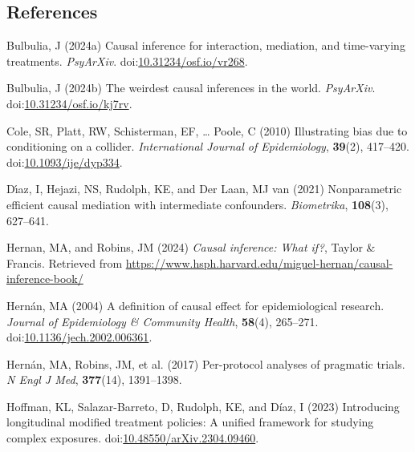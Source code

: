 \documentclass[
  single column]{article}
\newlength{\cslhangindent}
\newenvironment{CSLReferences}[2] %
 {\begin{list}{}{%
  \setlength{\itemindent}{0pt}
  \setlength{\leftmargin}{0pt}
  \setlength{\parsep}{0pt}
  \ifodd #1
   \setlength{\leftmargin}{\cslhangindent}
   \setlength{\itemindent}{-1\cslhangindent}
  \fi
  \setlength{\itemsep}{#2\baselineskip}}}
 {\end{list}}
\begin{document}
\newpage{}

\subsection{References}\label{references}

\label{refs}
\begin{CSLReferences}{1}{0}
Bulbulia, J (2024a) Causal inference for interaction, mediation, and
time-varying treatments. \emph{PsyArXiv}.
doi:\href{https://doi.org/10.31234/osf.io/vr268}{10.31234/osf.io/vr268}.

Bulbulia, J (2024b) The weirdest causal inferences in the world.
\emph{PsyArXiv}.
doi:\href{https://doi.org/10.31234/osf.io/kj7rv}{10.31234/osf.io/kj7rv}.

Cole, SR, Platt, RW, Schisterman, EF, \ldots{} Poole, C (2010)
Illustrating bias due to conditioning on a collider. \emph{International
Journal of Epidemiology}, \textbf{39}(2), 417--420.
doi:\href{https://doi.org/10.1093/ije/dyp334}{10.1093/ije/dyp334}.

Dı́az, I, Hejazi, NS, Rudolph, KE, and Der Laan, MJ van (2021)
Nonparametric efficient causal mediation with intermediate confounders.
\emph{Biometrika}, \textbf{108}(3), 627--641.

Hernan, MA, and Robins, JM (2024) \emph{Causal inference: What if?},
Taylor \& Francis. Retrieved from
\url{https://www.hsph.harvard.edu/miguel-hernan/causal-inference-book/}

Hernán, MA (2004) A definition of causal effect for epidemiological
research. \emph{Journal of Epidemiology \& Community Health},
\textbf{58}(4), 265--271.
doi:\href{https://doi.org/10.1136/jech.2002.006361}{10.1136/jech.2002.006361}.

Hernán, MA, Robins, JM, et al. (2017) Per-protocol analyses of pragmatic
trials. \emph{N Engl J Med}, \textbf{377}(14), 1391--1398.

Hoffman, KL, Salazar-Barreto, D, Rudolph, KE, and Díaz, I (2023)
Introducing longitudinal modified treatment policies: A unified
framework for studying complex exposures.
doi:\href{https://doi.org/10.48550/arXiv.2304.09460}{10.48550/arXiv.2304.09460}.


\end{CSLReferences}
\end{document}
